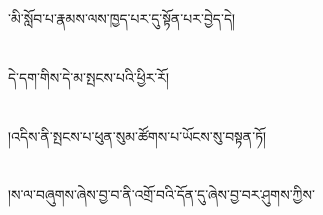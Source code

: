 ་མི་སློབ་པ་རྣམས་ལས་ཁྱད་པར་དུ་སྟོན་པར་བྱེད་དེ།\chapter{ }དེ་དག་གིས་དེ་མ་སྤངས་པའི་ཕྱིར་རོ།\chapter{ }།འདིས་ནི་སྤངས་པ་ཕུན་སུམ་ཚོགས་པ་ཡོངས་སུ་བསྟན་ཏོ།\chapter{ }།ས་ལ་བཞུགས་ཞེས་བྱ་བ་ནི་འགྲོ་བའི་དོན་དུ་ཞེས་བྱ་བར་ཤུགས་ཀྱིས་